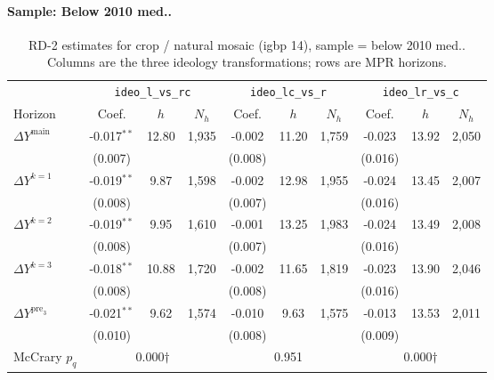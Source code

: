 \documentclass[11pt]{article}
\begin{document}
\paragraph{Sample: Below 2010 med..}
\begin{table}[H]
\centering
\scriptsize
\caption{RD-2 estimates for crop / natural mosaic (igbp 14), sample = below 2010 med..
Columns are the three ideology transformations; rows are MPR horizons.}
\label{tab:rd2_crop_nature_below}
\begin{tabular}{l ccc ccc ccc}
\toprule
 & \multicolumn{3}{c}{\texttt{ideo\_l\_vs\_rc}}
 & \multicolumn{3}{c}{\texttt{ideo\_lc\_vs\_r}}
 & \multicolumn{3}{c}{\texttt{ideo\_lr\_vs\_c}} \\
\cmidrule(lr){2-4} \cmidrule(lr){5-7} \cmidrule(lr){8-10}
Horizon & Coef. & $h$ & $N_h$ & Coef. & $h$ & $N_h$ & Coef. & $h$ & $N_h$ \\
\midrule
$\Delta Y^{\text{main}}$ & -0.017$^{**}$ & 12.80 & 1,935 & -0.002 & 11.20 & 1,759 & -0.023 & 13.92 & 2,050 \\
 & (0.007) &  &  & (0.008) &  &  & (0.016) &  &  \\
\addlinespace[1pt]
$\Delta Y^{k=1}$ & -0.019$^{**}$ & 9.87 & 1,598 & -0.002 & 12.98 & 1,955 & -0.024 & 13.45 & 2,007 \\
 & (0.008) &  &  & (0.007) &  &  & (0.016) &  &  \\
\addlinespace[1pt]
$\Delta Y^{k=2}$ & -0.019$^{**}$ & 9.95 & 1,610 & -0.001 & 13.25 & 1,983 & -0.024 & 13.49 & 2,008 \\
 & (0.008) &  &  & (0.007) &  &  & (0.016) &  &  \\
\addlinespace[1pt]
$\Delta Y^{k=3}$ & -0.018$^{**}$ & 10.88 & 1,720 & -0.002 & 11.65 & 1,819 & -0.023 & 13.90 & 2,046 \\
 & (0.008) &  &  & (0.008) &  &  & (0.016) &  &  \\
\addlinespace[1pt]
$\Delta Y^{\text{pre}_3}$ & -0.021$^{**}$ & 9.62 & 1,574 & -0.010 & 9.63 & 1,575 & -0.013 & 13.53 & 2,011 \\
 & (0.010) &  &  & (0.008) &  &  & (0.009) &  &  \\
\addlinespace[1pt]
\midrule
McCrary $p_q$ & \multicolumn{3}{c}{0.000$\dagger$} & \multicolumn{3}{c}{0.951} & \multicolumn{3}{c}{0.000$\dagger$} \\
\bottomrule
\end{tabular}
\end{table}
\end{document}
